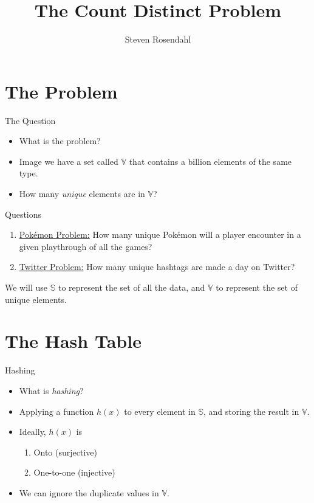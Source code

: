 \documentclass{beamer}
\title{The Count Distinct Problem}
\author{Steven Rosendahl}
\date{}
\begin{document}
\begin{frame}
\titlepage
\end{frame}

\section{The Problem}
\begin{frame}{The Question}
\begin{itemize}
\item What is the problem?
\pause
\item Image we have a set called $\mathbb{V}$ that contains a billion elements of the same type.
\pause
\item How many \textit{unique} elements are in $\mathbb{V}$?
\end{itemize}
\end{frame}

\begin{frame}{Questions}
\begin{enumerate}
\item \underline{Pok\'emon Problem:} How many unique Pok\'emon will a player encounter in a given playthrough of all the games?
\pause
\item \underline{Twitter Problem:} How many unique hashtags are made a day on Twitter?
\pause
\end{enumerate}
We will use $\mathbb{S}$ to represent the set of all the data, and $\mathbb{V}$ to represent the set of unique elements. 
\end{frame}

\section{The Hash Table}
\begin{frame}{Hashing}
\begin{itemize}
\item What is \textit{hashing}?
\pause
\item Applying a function $h(x)$ to every element in $\mathbb{S}$, and storing the result in $\mathbb{V}$.
\pause
\item Ideally, $h(x)$ is
\begin{enumerate}
\pause 
\item Onto (surjective)
\pause
\item One-to-one (injective)
\end{enumerate}
\pause
\item We can ignore the duplicate values in $\mathbb{V}$.
\end{itemize}
\end{frame}
\end{document}
